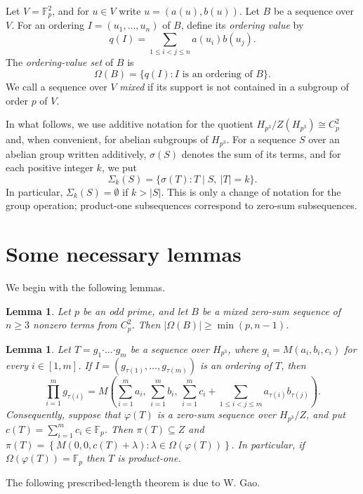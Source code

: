 \documentclass[a4paper, 12pt]{article}
\newtheorem{lemma}[theorem]{Lemma}
\theoremstyle{definition}
\begin{document}
Let $V=\mathbb F_p^2$, and for $u\in V$ write
$u=(a(u),b(u))$. Let $B$ be a sequence over $V$. For an ordering
$I=(u_1,\ldots,u_n)$ of $B$, define its \emph{ordering value} by
$$q(I)=\sum_{1\leq i<j\leq n}a(u_i)b(u_j).$$
The \emph{ordering-value set} of $B$ is
$$\Omega(B)=\{q(I):I\text{ is an ordering of }B\}.$$
We call a sequence over $V$ \emph{mixed} if its support
is not contained in a subgroup of order $p$ of $V$.


In what follows, we use additive notation for the quotient
$H_{p^3}/Z(H_{p^3})\cong C_p^2$ and, when convenient, for abelian
subgroups of $H_{p^3}$. For a sequence $S$ over an abelian group
written additively, $\sigma(S)$ denotes the sum of its terms, and
for each positive integer $k$, we put
$$\Sigma_k(S)=\{\sigma(T):T\mid S,\ |T|=k\}.$$
In particular, $\Sigma_k(S)=\emptyset$ if $k>|S|$.
This is only a change of notation for the group operation;
product-one subsequences correspond to zero-sum subsequences.


\section{Some necessary lemmas}

We begin with the following lemmas.

\begin{lemma}{\cite[Theorem 3.2]{Volkmann}}\label{lemma:growth}
Let $p$ be an odd prime, and let $B$ be a mixed zero-sum sequence of
$n\ge3$ nonzero terms from $C_p^2$. Then
$|\Omega(B)|\ge \min(p,n-1)$.
\end{lemma}


\begin{lemma}\cite[Lemma~6.1]{Volkmann}\label{lemma:criterion}
Let
$T=g_1\boldsymbol{\cdot}\ldots\boldsymbol{\cdot}g_m$
be a sequence over $H_{p^3}$, where
$g_i=M(a_i,b_i,c_i)$ for every $i\in[1,m]$. If
$I=(g_{\tau(1)},\ldots,g_{\tau(m)})$
is an ordering of $T$, then
$$\prod_{i=1}^m g_{\tau(i)}
=
M\left(
\sum_{i=1}^m a_i,\,
\sum_{i=1}^m b_i,\,
\sum_{i=1}^m c_i+
\sum_{1\leq i<j\leq m}
a_{\tau(i)}b_{\tau(j)}
\right).$$
Consequently, suppose that $\varphi(T)$ is a zero-sum sequence over
$H_{p^3}/Z$, and put
$c(T)=\sum_{i=1}^m c_i\in\mathbb F_p$. Then
$\pi(T)\subseteq Z$ and
$\pi(T)=
\left\{
M(0,0,c(T)+\lambda):
\lambda\in\Omega(\varphi(T))
\right\}.$ In particular, if $\Omega(\varphi(T))=\mathbb{F}_p$ then $T$ is product-one.
\end{lemma}

The following prescribed-length theorem is due to W. Gao.
\end{document}
